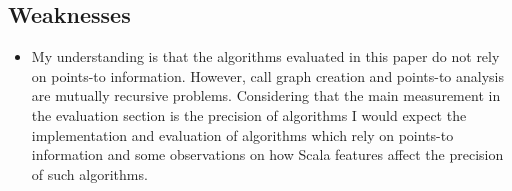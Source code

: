\documentclass{article} \usepackage{hyperref} \usepackage{graphicx}
\begin{document}
\subsection{Weaknesses}
\begin{itemize}
\item My understanding is that the algorithms evaluated in this paper
do not rely on points-to information. However, call graph creation and
points-to analysis are mutually recursive problems. Considering that
the main measurement in the evaluation section is the precision of
algorithms I would expect the implementation and evaluation of
algorithms which rely on points-to information and some observations
on how Scala features affect the precision of such algorithms.
\end{itemize}
\end{document}
